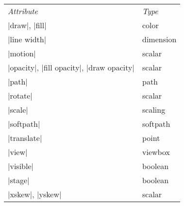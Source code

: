 \begin{command}{\pgfanimateattribute{}}
    \begin{tabular}{ll}
        \emph{Attribute}  & \emph{Type} \\
        |draw|, |fill|    & color \\
        |line width|      & dimension \\
        |motion|          & scalar \\
        |opacity|, |fill opacity|, |draw opacity| & scalar \\
        |path|            & path \\
        |rotate|          & scalar \\
        |scale|           & scaling \\
        |softpath|        & softpath \\
        |translate|       & point \\
        |view|            & viewbox \\
        |visible|         & boolean \\
        |stage|           & boolean \\
        |xskew|, |yskew|  & scalar \\
    \end{tabular}


\end{command}

